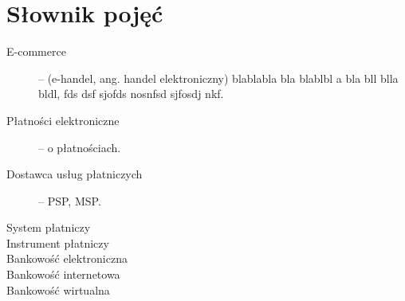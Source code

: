 \section*{Słownik pojęć}

\begin{description}
	\item[E-commerce] -- (e-handel, ang. handel elektroniczny) blablabla bla blablbl a bla bll blla bldl, fds dsf  sjofds nosnfsd sjfosdj nkf.
	\item[Płatności elektroniczne] -- o płatnościach.
	\item[Dostawca usług płatniczych] -- PSP, MSP.
	\item[System płatniczy]
	\item[Instrument płatniczy]
	\item[Bankowość elektroniczna]
	\item[Bankowość internetowa]
	\item[Bankowość wirtualna]
\end{description}
